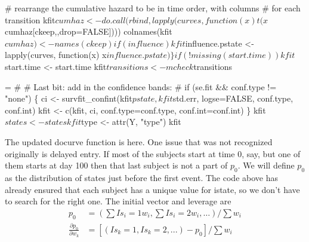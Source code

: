 \documentclass{article}
\begin{document}
\begin{nwchunk}
     # rearrange the cumulative hazard to be in time order, with columns
     #  for each transition
     kfit$cumhaz <- do.call(rbind, lapply(curves, function(x)
         t(x$cumhaz[ckeep,,drop=FALSE])))
     colnames(kfit$cumhaz) <- names(ckeep)
  
     if (influence) kfit$influence.pstate <- 
         lapply(curves, function(x) x$influence.pstate)
 \}                         
 
 if (!missing(start.time)) kfit$start.time <- start.time
 kfit$transitions <- mcheck$transitions
 
\end{nwchunk}

\begin{nwchunk}
=
 #       
 # Last bit: add in the confidence bands:
 #  
 if (se.fit && conf.type != "none") \{
     ci <- survfit_confint(kfit$pstate, kfit$std.err, logse=FALSE, 
                               conf.type, conf.int)
     kfit <- c(kfit, ci, conf.type=conf.type, conf.int=conf.int)
 \}
 kfit$states <- states
 kfit$type   <- attr(Y, "type")
 kfit
\end{nwchunk}

The updated docurve function is here.
One issue that was not recognized originally is delayed entry.  If most
of the subjects start at time 0, say, but one of them starts at day 100
then that last subject is not a part of $p_0$.
We will define $p_0$ as the distribution of states just before the first
event. 
The code above has already ensured that each subject has a unique
value for istate, so we don't have to search for the right one.
The initial vector and leverage are 
\begin{align*}
  p_0 &= (\sum I{s_i=1}w_i, \sum I{s_i=2}w_i, \ldots)/ \sum w_i \\
  \frac{\partial p_0}{\partial w_k} &= 
  [(I{s_k=1}, I{s_k=2}, ...)- p_0]/\sum w_i
\end{align*}
\end{document}
